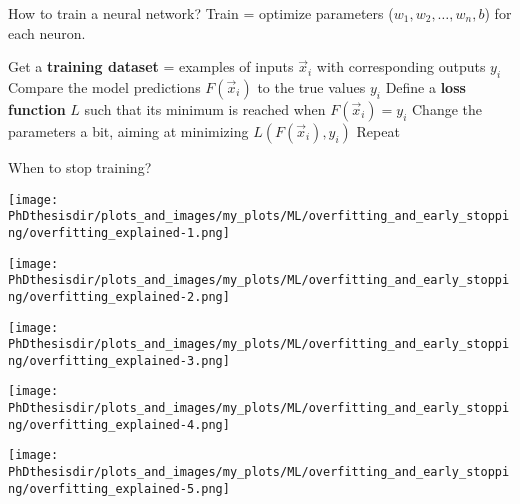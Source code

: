 \begin{frame}{How to train a neural network?}
Train = optimize parameters ($w_1, w_2, \ldots, w_n, b$) for each neuron.

\manip Get a \textbf{training dataset} = examples of inputs $\vec{x}_i$ with corresponding outputs $y_i$
\manip Compare the model predictions $F(\vec{x}_i)$ to the true values $y_i$
\submanip Define a \textbf{loss function} $L$ such that its minimum is reached when $F(\vec{x}_i) = y_i$
\submanip Change the parameters a bit, aiming at minimizing $L\left( F(\vec{x}_i), y_i \right)$
\submanip Repeat
\begin{center}
When to stop training?
\end{center}

\end{frame}

\begin{frame}
\begin{center}
\texttt{[image: \\PhDthesisdir/plots\_and\_images/my\_plots/ML/overfitting\_and\_early\_stopping/overfitting\_explained-1.png]}
\end{center}
\end{frame}
\begin{frame}\addtocounter{framenumber}{-1}
\begin{center}
\texttt{[image: \\PhDthesisdir/plots\_and\_images/my\_plots/ML/overfitting\_and\_early\_stopping/overfitting\_explained-2.png]}
\end{center}
\end{frame}
\begin{frame}\addtocounter{framenumber}{-1}
\begin{center}
\texttt{[image: \\PhDthesisdir/plots\_and\_images/my\_plots/ML/overfitting\_and\_early\_stopping/overfitting\_explained-3.png]}
\end{center}
\end{frame}
\begin{frame}\addtocounter{framenumber}{-1}
\begin{center}
\texttt{[image: \\PhDthesisdir/plots\_and\_images/my\_plots/ML/overfitting\_and\_early\_stopping/overfitting\_explained-4.png]}
\end{center}
\end{frame}
\begin{frame}\addtocounter{framenumber}{-1}
\begin{center}
\texttt{[image: \\PhDthesisdir/plots\_and\_images/my\_plots/ML/overfitting\_and\_early\_stopping/overfitting\_explained-5.png]}
\end{center}
\end{frame}

